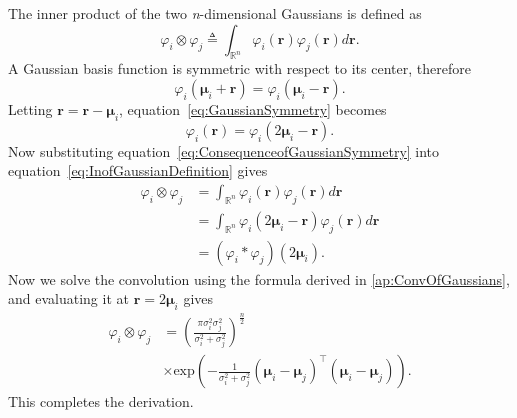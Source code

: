 \documentclass[review,authoryear,3p]{elsarticle}
\begin{document}
The inner product of the two \emph{n}-dimensional Gaussians is defined as
\begin{equation}\label{eq:InofGaussianDefinition}
\varphi_i\otimes\varphi_j \triangleq \int_{\mathbb{R}^n}\varphi_i(\mathbf r)\varphi_j(\mathbf r)d\mathbf{r}.
\end{equation}
A Gaussian basis function is symmetric with respect to its center, therefore
\begin{equation}\label{eq:GaussianSymmetry}
 \varphi_i(\boldsymbol \mu_i+\mathbf r)= \varphi_i(\boldsymbol \mu_i-\mathbf r).
\end{equation}
Letting $\mathbf{r}= \mathbf{r}-\boldsymbol{\mu}_i$, equation~\ref{eq:GaussianSymmetry} becomes
\begin{equation}\label{eq:ConsequenceofGaussianSymmetry}
 \varphi_i(\mathbf r)= \varphi_i(2\boldsymbol \mu_i-\mathbf r).
\end{equation}
Now substituting equation~\ref{eq:ConsequenceofGaussianSymmetry} into equation~\ref{eq:InofGaussianDefinition} gives 
\begin{align}
\varphi_i\otimes\varphi_j&=\int_{\mathbb{R}^n}\varphi_i(\mathbf r)\varphi_j(\mathbf r)d\mathbf r \nonumber\\
&=\int_{\mathbb{R}^n}\varphi_i(2\boldsymbol \mu_i-\mathbf r)\varphi_j(\mathbf r)d\mathbf r \nonumber\\
&=(\varphi_i*\varphi_j)(2\boldsymbol \mu_i).
\end{align}
Now we solve the convolution using the formula derived in \ref{ap:ConvOfGaussians}, and evaluating it at $\mathbf r=2\boldsymbol\mu_i $ gives
\begin{align}
 \varphi_i\otimes\varphi_j&=\left(\frac{\pi\sigma_i^2\sigma_j^2}{\sigma_i^2+\sigma_j^2}\right)^{\frac{n}{2}} \nonumber \\
&\times\mathrm{exp}\left({-\frac{1}{\sigma_i^2+\sigma_j^2} (\boldsymbol\mu_i-\boldsymbol\mu_j)^\top(\boldsymbol\mu_i-\boldsymbol\mu_j)}\right).
\end{align}
This completes the derivation.
\end{document}

